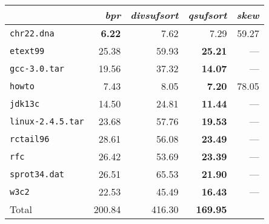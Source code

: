 \begin{tabular}{l r r r r } \toprule
 & \emph{bpr} & \emph{divsufsort} & \emph{qsufsort} & \emph{skew}\\ \midrule
\texttt{chr22.dna} & \textbf{6.22} & 7.62 & 7.29 & 59.27\\
\texttt{etext99} & 25.38 & 59.93 & \textbf{25.21} & ---\\
\texttt{gcc-3.0.tar} & 19.56 & 37.32 & \textbf{14.07} & ---\\
\texttt{howto} & 7.43 & 8.05 & \textbf{7.20} & 78.05\\
\texttt{jdk13c} & 14.50 & 24.81 & \textbf{11.44} & ---\\
\texttt{linux-2.4.5.tar} & 23.68 & 57.76 & \textbf{19.53} & ---\\
\texttt{rctail96} & 28.61 & 56.08 & \textbf{23.49} & ---\\
\texttt{rfc} & 26.42 & 53.69 & \textbf{23.39} & ---\\
\texttt{sprot34.dat} & 26.51 & 65.53 & \textbf{21.90} & ---\\
\texttt{w3c2} & 22.53 & 45.49 & \textbf{16.43} & ---\\
 \midrule
Total & 200.84 & 416.30 & \textbf{169.95} & \\
 \bottomrule
\end{tabular}
